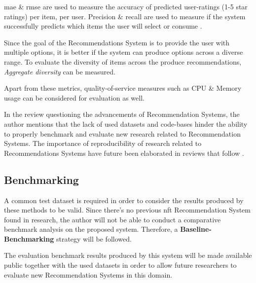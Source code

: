 \gls{mae} \& \gls{rmse} are used to measure the accuracy of predicted user-ratings (1-5 star ratings) per item, per user. Precision \& recall are used to measure if the system successfully predicts which items the user will select or consume \autocite{dayan_recommenders_2011}.


\bigbreak
Since the goal of the Recommendations System is to provide the user with multiple options, it is better if the system can produce options across a diverse range. To evaluate the diversity of items across the produce recommendations, \textit{Aggregate diversity} can be measured.

Apart from these metrics, quality-of-service measures such as CPU \& Memory usage can be considered for evaluation as well. 

\bigbreak
In the review questioning the advancements of Recommendation Systems, \autocite{dacrema_are_2019} the author mentions that the lack of used datasets and code-bases hinder the ability to properly benchmark and evaluate new research related to Recommendation Systems. The importance of reproducibility of research related to Recommendations Systems have future been elaborated in reviews that follow \autocite{dacrema_troubling_2021, ferrari_dacrema_critically_2020, dacrema_methodological_2020}.


\subsection{Benchmarking}

\bigbreak
A common test dataset is required in order to consider the results produced by these methods to be valid. Since there’s no previous \gls{nft} Recommendation System found in research, the author will not be able to conduct a comparative benchmark analysis on the proposed system. Therefore, a \textbf{Baseline-Benchmarking} strategy will be followed.

The evaluation benchmark results produced by this system will be made available public together with the used datasets in order to allow future researchers to evaluate new Recommendation Systems in this domain.


